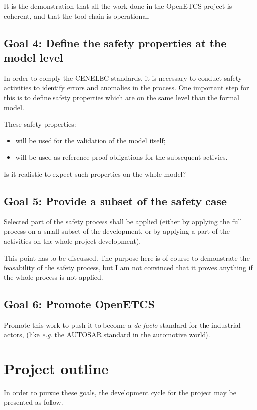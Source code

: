 \documentclass{template/openetcs_article}
\begin{document}
It is the demonstration that all the work done in the OpenETCS project is coherent, and that
the tool chain is operational.

\subsection{Goal 4: Define the safety properties at the model level}
In order to comply the CENELEC standards, it is necessary to conduct safety activities 
to identify errors and anomalies in the process. One important step for this is to define safety 
properties which are on the same level than the formal model.

These safety properties:
\begin{itemize}
\item will be used for the validation of the model itself;
\item will be used as reference proof obligations for the subsequent activies.
\end{itemize}

\begin{issue}
Is it realistic to expect such properties on the whole model? 
\end{issue}

\subsection{Goal 5: Provide a subset of the safety case}
Selected part of the safety process shall be applied (either by applying the full process on a small
subset of the development, or by applying a part of the activities on the whole project development).

\begin{issue}
This point has to be discussed. The purpose here is of course to demonstrate the feasability 
of the safety process, but I am not convinced that it proves anything if the whole process is 
not applied.
\end{issue}

\subsection{Goal 6: Promote OpenETCS}
Promote this work to push it to become a \emph{de facto} standard for the industrial actors, 
(like \emph{e.g.} the AUTOSAR standard in the automotive world).

\section{Project outline}
In order to pursue these goals, the development cycle for the project may be presented as follow. 
\end{document}
